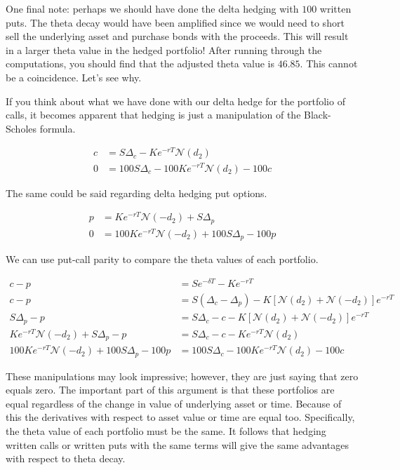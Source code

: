 \documentclass{ximera}
\begin{document}
One final note: perhaps we should have done the delta hedging with $100$ written puts. The theta decay would have been amplified since we would need to short sell the underlying asset and purchase bonds with the proceeds. This will result in a larger theta value in the hedged portfolio! After running through the computations, you should find that the adjusted theta value is $46.85$. This cannot be a coincidence. Let's see why.

If you think about what we have done with our delta hedge for the portfolio of calls, it becomes apparent that hedging is just a manipulation of the Black-Scholes formula.

\begin{align*}
c 			&=S\Delta_c-Ke^{-rT}\mathcal{N}(d_2)\\
0 			&=100S\Delta_c-100Ke^{-rT}\mathcal{N}(d_2)-100c
\end{align*}

The same could be said regarding delta hedging put options.

\begin{align*}
p 			&=Ke^{-rT}\mathcal{N}(-d_2)+S\Delta_p\\
0 			&=100Ke^{-rT}\mathcal{N}(-d_2)+100S\Delta_p-100p
\end{align*}

We can use put-call parity to compare the theta values of each portfolio.

\begin{align*}
c-p 								&=Se^{-\delta T}-Ke^{-rT}\\
c-p 								&=S(\Delta_c-\Delta_p)-K[\mathcal{N}(d_2)+\mathcal{N}(-d_2)]e^{-rT}\\
S\Delta_p-p 							&=S\Delta_c-c-K[\mathcal{N}(d_2)+\mathcal{N}(-d_2)]e^{-rT}\\
Ke^{-rT}\mathcal{N}(-d_2)+S\Delta_p-p 		&=S\Delta_c-c-Ke^{-rT}\mathcal{N}(d_2)\\
100Ke^{-rT}\mathcal{N}(-d_2)+100S\Delta_p-100p 	&=100S\Delta_c-100Ke^{-rT}\mathcal{N}(d_2)-100c
\end{align*}

These manipulations may look impressive; however, they are just saying that zero equals zero. The important part of this argument is that these portfolios are equal regardless of the change in value of underlying asset or time. Because of this the derivatives with respect to asset value or time are equal too. Specifically, the theta value of each portfolio must be the same. It follows that hedging written calls or written puts with the same terms will give the same advantages with respect to theta decay.
\end{document}
